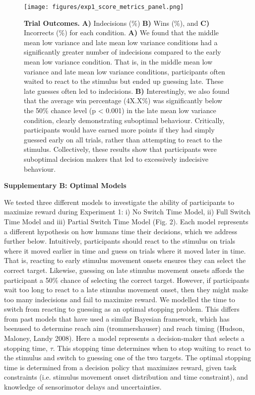 \documentclass[12pt,letterpaper]{article}
\begin{document}
\begin{figure}[H]
    \centering
    \texttt{[image: figures/exp1\_score\_metrics\_panel.png]}
    \renewcommand\figurename{Supplementary Figure}

    \caption{\textbf{Trial Outcomes.} \textbf{A)} Indecisions (\%) \textbf{B)} Wins (\%), and \textbf{C)} Incorrects (\%) for each condition. \textbf{A)} We found that the middle mean low variance and late mean low variance conditions had a significantly greater number of indecisions compared to the early mean low variance condition. That is, in the middle mean low variance and late mean low variance conditions, participants often waited to react to the stimulus but ended up guessing late. These late guesses often led to indecisions. \textbf{B)} Interestingly, we also found that the average win percentage (4X.X\%) was significantly below the 50\% chance level (p < 0.001) in the late mean low variance condition, clearly demonstrating suboptimal behaviour. Critically, participants would have earned more points if they had simply guessed early on all trials, rather than attempting to react to the stimulus. Collectively, these results show that participants were suboptimal decision makers that led to excessively indecisive behaviour.}
\end{figure}


\noindent\textbf{\large\textcolor{mydarkblue}{Supplementary B: Optimal Models}}

We tested three different models to investigate the ability of participants to maximize reward during Experiment 1: i) No Switch Time Model, ii) Full Switch Time Model and iii) Partial Switch Time Model (Fig. 2). Each model represents a different hypothesis on how humans time their decisions, which we address further below. Intuitively, participants should react to the stimulus on trials where it moved earlier in time and guess on trials where it moved later in time. That is, reacting to early stimulus movement onsets ensures they can select the correct target. Likewise, guessing on late stimulus movement onsets affords the participant a 50\% chance of selecting the correct target. However, if participants wait too long to react to a late stimulus movement onset, then they might make too many indecisions and fail to maximize reward.
We modelled the time to switch from reacting to guessing as an optimal stopping problem. This differs from past models that have used a similar Bayesian framework, which has beenused to determine reach aim (trommershauser) and reach timing (Hudson, Maloney, Landy 2008). Here a model represents a decision-maker that selects a stopping time, $\tau$. This stopping time determines when to stop waiting to react to the stimulus and switch to guessing one of the two targets. The optimal stopping time is determined from a decision policy that maximizes reward, given task constraints (i.e. stimulus movement onset distribution and time constraint), and knowledge of sensorimotor delays and uncertainties.
\end{document}
